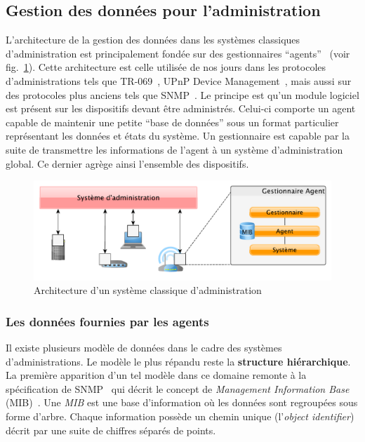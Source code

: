\subsection{Gestion des données pour l'administration}
L'architecture de la gestion des données dans les systèmes classiques d'administration est principalement fondée sur des gestionnaires \enquote{agents}~\cite{CCITT:X700} (voir fig.~\ref{fig:rw:supervision:administration}). Cette architecture est celle utilisée de nos jours dans les protocoles d'administrations tels que TR-069~\cite{BBF:tr069}, UPnP Device Management~\cite{UPnP:DM2}, mais aussi sur des protocoles plus anciens tels que SNMP~\cite{IETF:SNMP}. Le principe est qu'un module logiciel est présent sur les dispositifs devant être administrés. Celui-ci comporte un agent capable de maintenir une petite \enquote{base de données} sous un format particulier représentant les données et états du système. Un gestionnaire est capable par la suite de transmettre les informations de l'agent à un système d'administration global. Ce dernier agrège ainsi l'ensemble des dispositifs.
\begin{figure}[ht]
    \centering
    \includegraphics[width=.70\textwidth]{fig/rw-supervision-administration}
    \caption{Architecture d'un système classique d'administration}\label{fig:rw:supervision:administration}
\end{figure}

\subsubsection{Les données fournies par les agents}
Il existe plusieurs modèle de données dans le cadre des systèmes d'administrations. Le modèle le plus répandu reste la \textbf{structure hiérarchique}. La première apparition d'un tel modèle dans ce domaine remonte à la spécification de SNMP~\cite{IETF:SNMP} qui décrit le concept de \textit{Management Information Base} (MIB)~\cite{IETF:MIB}. Une \textit{MIB} est une base d'information où les données sont regroupées sous forme d'arbre. Chaque information possède un chemin unique (l'\textit{object identifier}) décrit par une suite de chiffres séparés de points.

